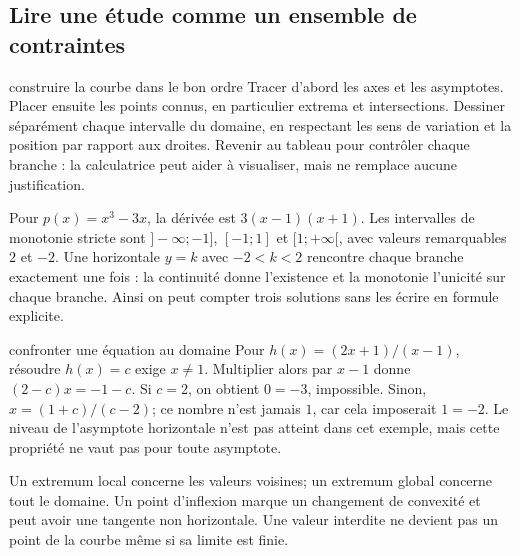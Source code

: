 
\subsection*{Lire une étude comme un ensemble de contraintes}
\begin{methode}{construire la courbe dans le bon ordre}
Tracer d’abord les axes et les asymptotes. Placer ensuite les points connus, en particulier extrema et intersections. Dessiner séparément chaque intervalle du domaine, en respectant les sens de variation et la position par rapport aux droites. Revenir au tableau pour contrôler chaque branche : la calculatrice peut aider à visualiser, mais ne remplace aucune justification.
\end{methode}
\begin{exemple}
Pour $p(x)=x^3-3x$, la dérivée est $3(x-1)(x+1)$. Les intervalles de monotonie stricte sont $]-\infty;-1]$, $[-1;1]$ et $[1;+\infty[$, avec valeurs remarquables $2$ et $-2$. Une horizontale $y=k$ avec $-2<k<2$ rencontre chaque branche exactement une fois : la continuité donne l’existence et la monotonie l’unicité sur chaque branche. Ainsi on peut compter trois solutions sans les écrire en formule explicite.
\end{exemple}
\begin{methode}{confronter une équation au domaine}
Pour $h(x)=(2x+1)/(x-1)$, résoudre $h(x)=c$ exige $x\ne1$. Multiplier alors par $x-1$ donne $(2-c)x=-1-c$. Si $c=2$, on obtient $0=-3$, impossible. Sinon, $x=(1+c)/(c-2)$; ce nombre n’est jamais $1$, car cela imposerait $1=-2$. Le niveau de l’asymptote horizontale n’est pas atteint dans cet exemple, mais cette propriété ne vaut pas pour toute asymptote.
\end{methode}
\begin{avertissement}
Un extremum local concerne les valeurs voisines; un extremum global concerne tout le domaine. Un point d’inflexion marque un changement de convexité et peut avoir une tangente non horizontale. Une valeur interdite ne devient pas un point de la courbe même si sa limite est finie.
\end{avertissement}

